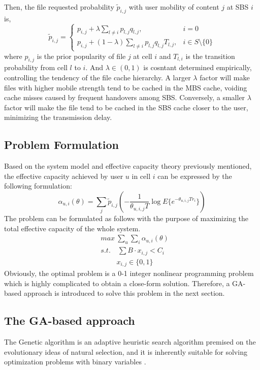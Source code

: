 \documentclass[conference]{IEEEtran}
\begin{document}
Then, the file requested probability ${\tilde{p}_{i,j}}$ with user mobility of content $j$ at SBS $i$ is,
\begin{equation}
{\tilde{p}_{i,j}}=
\begin{cases}
p_{i,j}+\lambda\sum_{l\neq i}p_{l,j}q_{l,j},  & i=0\\
p_{i,j}+(1-\lambda)\sum_{l\neq i}p_{l,j}q_{l,j}T_{l,j}, & i\in S\setminus\{0\}
\end{cases}
\end{equation}
where $p_{i,j}$ is the prior popularity of file $j$ at cell $i$ and $T_{l,i}$ is the transition probability from cell $l$ to $i$. And $\lambda\in(0,1)$ is cosntant determined empirically, controlling the tendency of the file cache hierarchy. A larger $\lambda$ factor will make files with higher mobile strength tend to be cached in the MBS cache, voiding cache misses caused by frequent handovers among SBS. Conversely, a smaller $\lambda$ factor will make the file tend to be cached in the SBS cache closer to the user, minimizing the transmission delay.

\subsection{Problem Formulation}
Based on the system model and effective capacity theory previously mentioned, the effective capacity achieved by user $u$ in cell $i$ can be expressed by the following formulation:
\begin{equation}
\alpha_{u,i}(\theta)=\sum_j{\tilde{p}_{i,j}}(-\frac{1}{\theta_{u,i,j}T}\log E\{e^{-\theta_{u,i,j}Tr_i}\})
\end{equation}
The problem can be formulated as follows with the purpose of maximizing the total effective capacity of the whole system.
\begin{equation}
 \begin{aligned}
   & {max}\ \sum_u\sum_i\alpha_{u,i}(\theta)\\
   & s.t. \quad\sum B\cdot x_{i,j}<C_i\\
   & \qquad \ x_{i,j}\in\{0,1\}
 \end{aligned}
\end{equation}
Obviously, the optimal problem is a 0-1 integer nonlinear programming problem which is highly complicated to obtain a close-form solution. Therefore, a GA-based approach is introduced to solve this problem in the next section.

\subsection{The GA-based approach}
The Genetic algorithm is an adaptive heuristic search algorithm premised on the evolutionary ideas of natural selection, and it is inherently suitable for solving optimization problems with binary variables \cite{Srinivas2002Genetic}.
\end{document}
